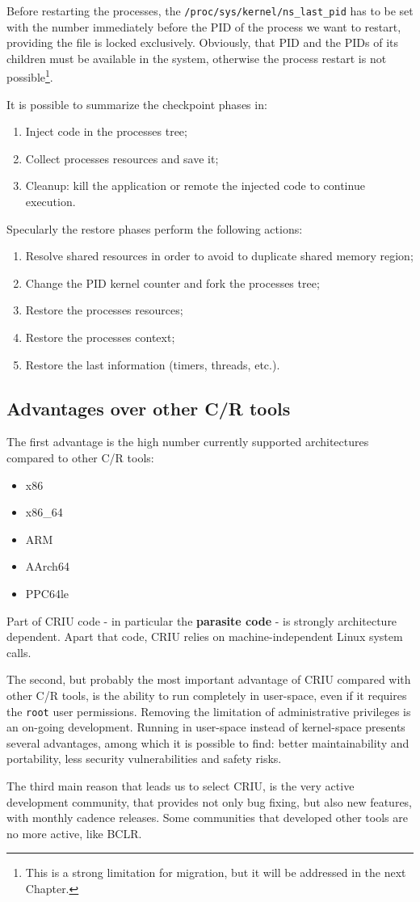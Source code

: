 Before restarting the processes, the
\texttt{/proc/sys/kernel/ns\_last\_pid} has
to be set with the number immediately before the PID of the process we want to
restart, providing the file is locked exclusively.
Obviously, that PID and the PIDs of its children must be available
in the system, otherwise the process restart is not possible\footnote{This 
is a strong limitation for migration, but it will be addressed in the next
Chapter.}.

It is possible to summarize the checkpoint phases in:
\begin{enumerate}
\item Inject code in the processes tree;
\item Collect processes resources and save it;
\item Cleanup: kill the application or remote the injected code to continue 
execution.
\end{enumerate}
Specularly the restore phases perform the following actions:
\begin{enumerate}
\item Resolve shared resources in order to avoid to duplicate shared memory
region;
\item Change the PID kernel counter and fork the processes tree;
\item Restore the processes resources;
\item Restore the processes context;
\item Restore the last information (timers, threads, etc.).
\end{enumerate}

\subsection{Advantages over other C/R tools}
The first advantage is the high number currently supported architectures
compared to other C/R tools:
\begin{itemize}
\item x86
\item x86\_64
\item ARM
\item AArch64
\item PPC64le
\end{itemize}
Part of CRIU code - in particular the \textbf{parasite code} - is 
strongly architecture dependent. Apart that code, CRIU relies on
machine-independent Linux system calls.

The second, but probably the most important advantage of CRIU compared with other
C/R tools, is the
ability to run completely in user-space, even if it requires the \texttt{root}
user  permissions. Removing the limitation of administrative privileges is an
on-going development. Running in user-space instead of kernel-space
presents several advantages, among which it is possible to find: better
maintainability and portability, less security vulnerabilities
and safety risks.

The third main reason that leads us to select CRIU, is the very active
development community, that provides not only bug fixing, but also new features,
with monthly cadence releases. Some communities that developed other tools are
no more active, like BCLR.





